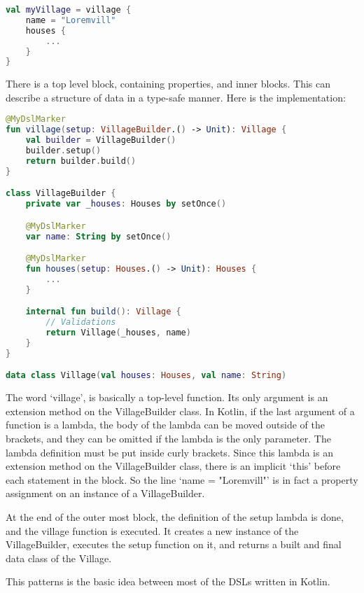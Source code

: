 \begin{lstlisting}[caption={Example DSL usage},language=Kotlin,label=code:pattern_example_usage]
val myVillage = village {
    name = "Loremvill"
    houses {
        ...
    }
}
\end{lstlisting}

There is a top level block, containing properties, and inner blocks. This can describe a structure of data in a type-safe manner. Here is the implementation:

\begin{lstlisting}[caption={Pattern example},language=Kotlin,label=code:pattern_example_impl]
@MyDslMarker 
fun village(setup: VillageBuilder.() -> Unit): Village {
    val builder = VillageBuilder()
    builder.setup()
    return builder.build()
}

class VillageBuilder {
    private var _houses: Houses by setOnce()

    @MyDslMarker 
    var name: String by setOnce()

    @MyDslMarker 
    fun houses(setup: Houses.() -> Unit): Houses {
        ...
    }

    internal fun build(): Village {
        // Validations
        return Village(_houses, name)
    }
}

data class Village(val houses: Houses, val name: String)
\end{lstlisting}

The word `village', is basically a top-level function. Its only argument is an extension method on the VillageBuilder class. In Kotlin, if the last argument of a function is a lambda, the body of the lambda can be moved outside of the brackets, and they can be omitted if the lambda is the only parameter. The lambda definition must be put inside curly brackets. Since this lambda is an extension method on the VillageBuilder class, there is an implicit `this' before each statement in the block. So the line `name = "Loremvill"' is in fact a property assignment on an instance of a VillageBuilder.

At the end of the outer most block, the definition of the setup lambda is done, and the village function is executed. It creates a new instance of the VillageBuilder, executes the setup function on it, and returns a built and final data class of the Village.

This patterns is the basic idea between most of the DSLs written in Kotlin.

